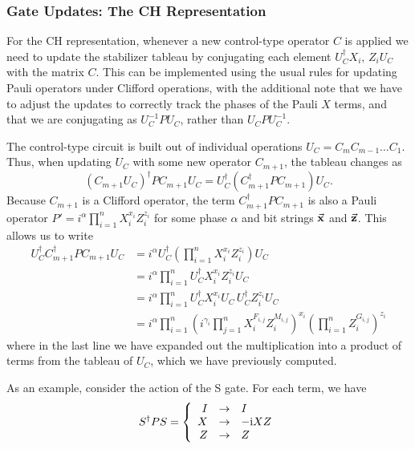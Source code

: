 \subsubsection{Gate Updates: The CH Representation}
For the CH representation, whenever a new control-type operator $C$ is applied we need to update the stabilizer tableau by conjugating each element $U_{C}^{\dagger}X_{i},\,Z_{i}U_{C}$ with the matrix $C$. This can be implemented using the usual rules for updating Pauli operators under Clifford operations, with the additional note that we have to adjust the updates to correctly track the phases of the Pauli $X$ terms, and that we are conjugating as $U_{C}^{-1}PU_{C}$, rather than $U_{C}PU_{C}^{-1}$.\par
The control-type circuit is built out of individual operations $U_{C}=C_{m}C_{m-1}\dots C_{1}$. Thus, when updating $U_{C}$ with some new operator $C_{m+1}$, the tableau changes as
\begin{equation}
\left(C_{m+1}U_{C}\right)^{\dagger} P C_{m+1}U_{C} = U_{C}^{\dagger} \left(C_{m+1}^{\dagger}PC_{m+1}\right)U_{C}.
\end{equation}
Because $C_{m+1}$ is a Clifford operator, the term $C^{\dagger}_{m+1}PC_{m+1}$ is also a Pauli operator $P'=i^{\alpha}\prod_{i=1}^{n}X_{i}^{x_{i}}Z_{i}^{z_{i}}$ for some phase $\alpha$ and bit strings $\va{x}$ and $\va{z}$. This allows us to write
\begin{align}
U_{C}^{\dagger} C_{m+1}^{\dagger}PC_{m+1} U_{C} &= i^{\alpha} U_{C}^{\dagger}\left(\prod_{i=1}^{n}X_{i}^{x_{i}}Z_{i}^{z_{i}}\right)U_{C} \nonumber \\
&= i^{\alpha} \prod_{i=1}^{n} U_{C}^{\dagger} X_{i}^{x_{i}} Z_{i}^{z_{i}}U_{C} \nonumber \\
&= i^{\alpha} \prod_{i=1}^{n}U_{C}^{\dagger} X_{i}^{x_{i}}U_{C}\,U_{C}^{\dagger}Z_{i}^{z_{i}}U_{C} \nonumber \\
&= i^{\alpha} \prod_{i=1}^{n}\left(i^{\gamma_{i}} \prod_{j=1}^{n}X_{i}^{F_{i,j}}Z_{i}^{M_{i,j}}\right)^{x_{i}}\left(\prod_{i=1}^{n}Z_{i}^{G_{i,j}}\right)^{z_{i}}
\label{eq:expanded_leftupdate}
\end{align}
where in the last line we have expanded out the multiplication into a product of terms from the tableau of $U_{C}$, which we have previously computed.\par
As an example, consider the action of the S gate. For each term, we have
\[
S^{\dagger}PS =  \left\{ \begin{array}{rcl}
    I & \rightarrow & I \\
    X & \rightarrow & -\mathrm{i} XZ \\
    Z & \rightarrow & Z \\
    \end{array}\right.
\]
